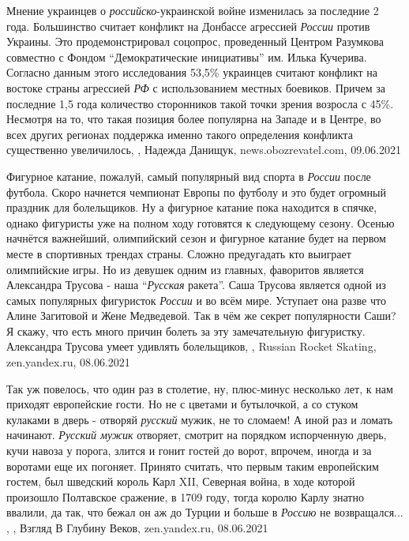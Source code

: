 Мнение украинцев о \emph{российско}-украинской войне изменилась за последние 2
года. Большинство считает конфликт на Донбассе агрессией \emph{России} против
Украины. Это продемонстрировал соцопрос, проведенный Центром Разумкова
совместно с Фондом \enquote{Демократические инициативы} им. Илька Кучерива.
Согласно данным этого исследования 53,5\% украинцев считают конфликт на востоке
страны агрессией \emph{РФ} с использованием местных боевиков.  Причем за
последние 1,5 года количество сторонников такой точки зрения возросла с 45\%.
Несмотря на то, что такая позиция более популярна на Западе и в Центре, во всех
других регионах поддержка именно такого определения конфликта существенно
увеличилось,
, Надежда Данищук, news.obozrevatel.com, 09.06.2021

Фигурное катание, пожалуй, самый популярный вид спорта в \emph{России} после
футбола.  Скоро начнется чемпионат Европы по футболу и это будет огромный
праздник для болельщиков. Ну а фигурное катание пока находится в спячке, однако
фигуристы уже на полном ходу готовятся к следующему сезону. Осенью начнётся
важнейший, олимпийский сезон и фигурное катание будет на первом месте в
спортивных трендах страны. Сложно предугадать кто выиграет олимпийские игры. Но
из девушек одним из главных, фаворитов является Александра Трусова - наша
\enquote{\emph{Русская} ракета}. Саша Трусова является одной из самых
популярных фигуристок \emph{России} и во всём мире. Уступает она разве что
Алине Загитовой и Жене Медведевой. Так в чём же секрет популярности Саши? Я
скажу, что есть много причин болеть за эту замечательную фигуристку. Александра
Трусова умеет удивлять болельщиков,
, Russian Rocket Skating, zen.yandex.ru, 08.06.2021

Так уж повелось, что один раз в столетие, ну, плюс-минус несколько лет, к нам
приходят европейские гости. Но не с цветами и бутылочкой, а со стуком кулаками
в дверь - отворяй \emph{русский} мужик, не то сломаем! А иной раз и ломать начинают.
\emph{Русский мужик} отворяет, смотрит на порядком испорченную дверь, кучи навоза у
порога, злится и гонит гостей до ворот, впрочем, иногда и за воротами еще их
погоняет.  Принято считать, что первым
таким европейским гостем, был шведский король Карл XII, Северная война, в ходе
которой произошло Полтавское сражение, в 1709 году, тогда королю Карлу знатно
ввалили, да так, что бежал он аж до Турции и больше в \emph{Россию} не возвращался... ,
, 
Взгляд В Глубину Веков, zen.yandex.ru, 08.06.2021

